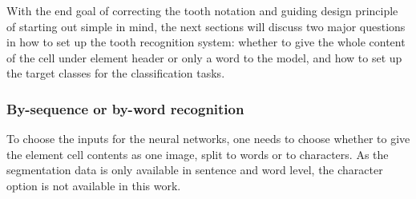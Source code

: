 \documentclass{article}
\begin{document}
With the end goal of correcting the tooth notation and guiding design principle of starting out simple in mind, the next sections will discuss two major questions 
in how to set up the tooth recognition system: whether to give the whole content of the cell under element header 
 or only a word to the model, and how to set up the target classes for the classification tasks.

\subsubsection{By-sequence or by-word recognition}

To choose the inputs for the neural networks, one needs to choose whether to give the
element cell contents as one image, split to words or to characters. As the segmentation 
data is only available in sentence and word level, the character option is not available in this work.

\end{document}

